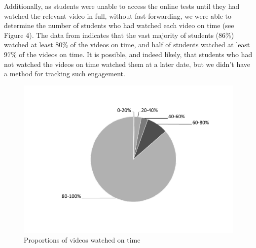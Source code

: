 \documentclass{amsart}
\begin{document}
Additionally, as students were unable to access the online tests until they had watched the relevant video in full, without fast-forwarding, we were able to determine the number of students who had watched each video on time (see Figure 4).  The data from indicates that the vast majority of students (86\%) watched at least $80\%$ of the videos on time, and half of students watched at least $97\%$ of the videos on time.  It is possible, and indeed likely, that students who had not watched the videos on time watched them at a later date, but we didn't have a method for tracking such engagement.

\begin{center}
\begin{figure}[hbt]
\includegraphics[width=1\textwidth]{figure4.pdf}
\caption{Proportions of videos watched on time}
\end{figure}
\end{center}

\end{document}
